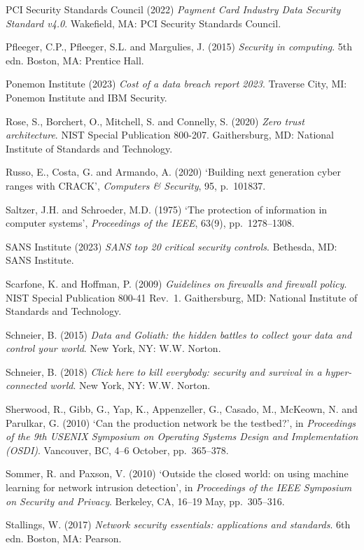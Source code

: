 PCI Security Standards Council (2022) \textit{Payment Card Industry Data Security Standard v4.0}. Wakefield, MA: PCI Security Standards Council.

Pfleeger, C.P., Pfleeger, S.L. and Margulies, J. (2015) \textit{Security in computing}. 5th edn. Boston, MA: Prentice Hall.

Ponemon Institute (2023) \textit{Cost of a data breach report 2023}. Traverse City, MI: Ponemon Institute and IBM Security.

Rose, S., Borchert, O., Mitchell, S. and Connelly, S. (2020) \textit{Zero trust architecture}. NIST Special Publication 800-207. Gaithersburg, MD: National Institute of Standards and Technology.

Russo, E., Costa, G. and Armando, A. (2020) `Building next generation cyber ranges with CRACK', \textit{Computers \& Security}, 95, p.~101837.

Saltzer, J.H. and Schroeder, M.D. (1975) `The protection of information in computer systems', \textit{Proceedings of the IEEE}, 63(9), pp.~1278--1308.

SANS Institute (2023) \textit{SANS top 20 critical security controls}. Bethesda, MD: SANS Institute.

Scarfone, K. and Hoffman, P. (2009) \textit{Guidelines on firewalls and firewall policy}. NIST Special Publication 800-41 Rev.~1. Gaithersburg, MD: National Institute of Standards and Technology.

Schneier, B. (2015) \textit{Data and Goliath: the hidden battles to collect your data and control your world}. New York, NY: W.W. Norton.

Schneier, B. (2018) \textit{Click here to kill everybody: security and survival in a hyper-connected world}. New York, NY: W.W. Norton.

Sherwood, R., Gibb, G., Yap, K., Appenzeller, G., Casado, M., McKeown, N. and Parulkar, G. (2010) `Can the production network be the testbed?', in \textit{Proceedings of the 9th USENIX Symposium on Operating Systems Design and Implementation (OSDI)}. Vancouver, BC, 4--6 October, pp.~365--378.

Sommer, R. and Paxson, V. (2010) `Outside the closed world: on using machine learning for network intrusion detection', in \textit{Proceedings of the IEEE Symposium on Security and Privacy}. Berkeley, CA, 16--19 May, pp.~305--316.

Stallings, W. (2017) \textit{Network security essentials: applications and standards}. 6th edn. Boston, MA: Pearson.

